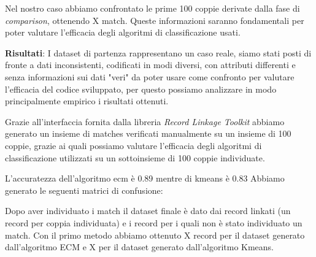 \documentclass[a4paper,12pt]{article}
\begin{document}
Nel nostro caso abbiamo confrontato le prime 100 coppie derivate dalla fase di \textit{comparison}, ottenendo X match. Queste informazioni saranno fondamentali per poter valutare l'efficacia degli algoritmi di classificazione usati. 

\textbf{Risultati}: 
I dataset di partenza rappresentano un caso reale, siamo stati posti di fronte a dati inconsistenti, codificati in modi diversi, con attributi differenti e senza informazioni sui dati "veri" da poter usare come confronto per valutare l'efficacia del codice sviluppato, per questo possiamo analizzare in modo principalmente empirico i risultati ottenuti.

Grazie all'interfaccia fornita dalla libreria \textit{Record Linkage Toolkit} abbiamo generato un insieme di matches verificati manualmente su un insieme di 100 coppie, grazie ai quali possiamo valutare l'efficacia degli algoritmi di classificazione utilizzati su un sottoinsieme di 100 coppie individuate.

L'accuratezza dell'algoritmo ecm è 0.89 mentre di kmeans è 0.83
Abbiamo generato le seguenti matrici di confusione:

Dopo aver individuato i match il dataset finale è dato dai record linkati (un record per coppia individuata) e i record per i quali non è stato individuato un match.
Con il primo metodo abbiamo ottenuto X record per il dataset generato dall'algoritmo ECM e X per il dataset generato dall'algoritmo Kmeans.


\newpage
\printbibliography[title=Bibliografia]
\end{document}
